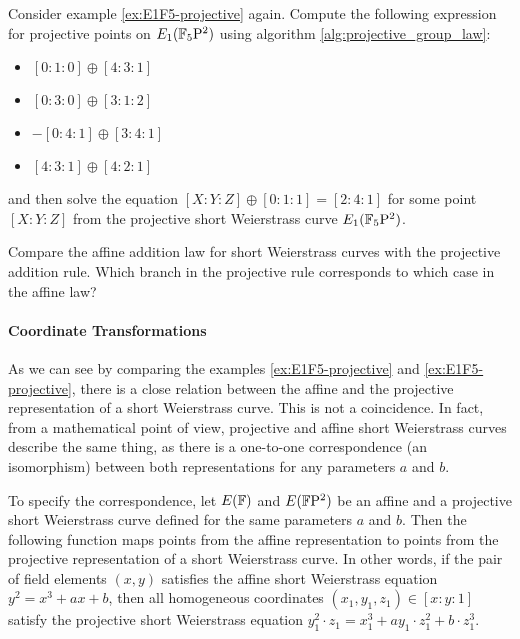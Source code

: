
\begin{exercise} Consider example \ref{ex:E1F5-projective} again. Compute the following expression for projective points on $E_1(\mathbb{F}_5\mathrm{P}^2)$ using algorithm \ref{alg:projective_group_law}:
\begin{itemize}
\item $[0:1:0]\oplus [4:3:1]$
\item $[0:3:0]\oplus [3:1:2]$
\item $-[0:4:1]\oplus [3:4:1]$
\item $[4:3:1]\oplus [4:2:1]$
\end{itemize}
and then solve the equation $[X:Y:Z] \oplus [0:1:1]= [2:4:1]$ for some point $[X:Y:Z]$ from the projective short Weierstrass curve $E_1(\mathbb{F}_5\mathrm{P}^2)$.
\end{exercise}

\begin{exercise}
Compare the affine addition law for short Weierstrass curves with the projective addition rule. Which branch in the projective rule corresponds to which case in the affine law? 
\end{exercise}

\paragraph{Coordinate Transformations} As we can see by comparing the examples 
\ref{ex:E1F5-projective} and \ref{ex:E1F5-projective}, there is a close relation between the affine and the projective representation of a short Weierstrass curve. This is not a coincidence. In fact, from a mathematical point of view, projective and affine short Weierstrass curves describe the same thing, as there is a one-to-one correspondence (an isomorphism) between both representations for any parameters $a$ and $b$. 

To specify the correspondence, let $E(\mathbb{F})$ and $E(\mathbb{F}\mathrm{P}^2)$ be an affine and a projective short Weierstrass curve defined for the same parameters $a$ and $b$. Then the following function maps points from the affine representation to points from the projective representation of a short Weierstrass curve. In other words, if the pair of field elements $(x,y)$ satisfies the affine short Weierstrass equation $y^2= x^3 + ax + b$, then all homogeneous coordinates $(x_1,y_1,z_1)\in [x:y:1]$ satisfy the projective short Weierstrass equation $y_1^2\cdot z_1= x_1^3 + ay_1\cdot z_1^2 + b\cdot z_1^3$. 

